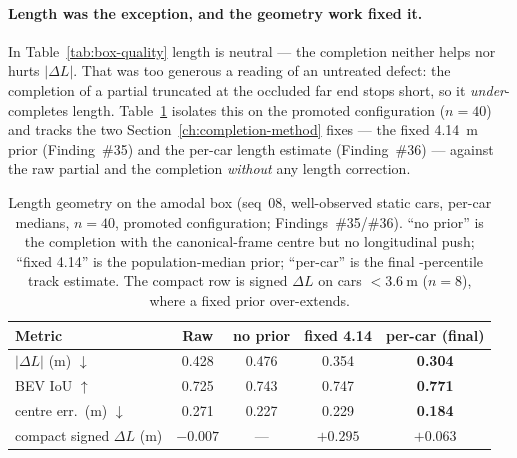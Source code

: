 \paragraph{Length was the exception, and the geometry work fixed it.} In
Table~\ref{tab:box-quality} length is neutral --- the completion neither helps nor
hurts $|\Delta L|$. That was too generous a reading of an untreated defect: the
completion of a partial truncated at the occluded far end stops short, so it
\emph{under}-completes length. Table~\ref{tab:length-geometry} isolates this on
the promoted configuration ($n=40$) and tracks the two Section~\ref{ch:completion-method} fixes ---
the fixed \SI{4.14}{\meter} prior (Finding~\#35) and the per-car length estimate
(Finding~\#36) --- against the raw partial and the completion \emph{without} any
length correction.

\begin{table}[H]
  \centering
  \caption{Length geometry on the amodal box (seq~08, well-observed static cars,
    per-car medians, $n=40$, promoted configuration; Findings~\#35/\#36).
    ``no prior'' is the completion with the canonical-frame centre but no
    longitudinal push; ``fixed \SI{4.14}{}'' is the population-median prior;
    ``per-car'' is the final -percentile track estimate. The compact
    row is signed $\Delta L$ on cars ${<}\SI{3.6}{\meter}$ ($n=8$), where a fixed
    prior over-extends.}
  \label{tab:length-geometry}
  \begin{tabular}{lcccc}
    \toprule
    Metric & Raw & no prior & fixed \SI{4.14}{} & \textbf{per-car (final)} \\
    \midrule
    $|\Delta L|$ (m) $\downarrow$   & 0.428 & 0.476 & 0.354 & \textbf{0.304} \\
    BEV IoU $\uparrow$              & 0.725 & 0.743 & 0.747 & \textbf{0.771} \\
    centre err.\ (m) $\downarrow$   & 0.271 & 0.227 & 0.229 & \textbf{0.184} \\
    \midrule
    compact signed $\Delta L$ (m)   & $-0.007$ & --- & $+0.295$ & \textbf{$+0.063$} \\
    \bottomrule
  \end{tabular}
\end{table}

